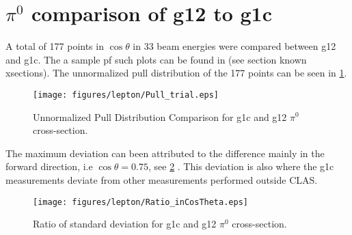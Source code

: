 \section{$\pi^0$ comparison of g12 to g1c}

A total of 177 points in $\cos \theta$ in 33 beam energies were compared between g12 and g1c. The a sample pf such plots can be found in (see section known xsections). The unnormalized pull distribution of the 177 points can be seen in \ref{fig:pi0pull}.
\begin{figure}[htpb]\begin{center}
\texttt{[image: figures/lepton/Pull\_trial.eps]}
\caption[Unnormalized Pull Distribution Comparison for g1c and g12 $\pi^0$ cross-section]{\label{fig:pi0pull}Unnormalized Pull Distribution Comparison for g1c and g12 $\pi^0$ cross-section.}
\end{center}\end{figure}

The maximum deviation can been attributed to the difference mainly in the forward direction, i.e $\cos \theta = 0.75$, see \ref{fig:pi0pulldev} . This deviation is also where the g1c measurements deviate from other measurements performed outside CLAS.
\begin{figure}[htpb]\begin{center}
\texttt{[image: figures/lepton/Ratio\_inCosTheta.eps]}
\caption[Ratio of Standard Deviation for g1c and g12 $\pi^0$ cross-section]{\label{fig:pi0pulldev}Ratio of standard deviation for g1c and g12 $\pi^0$ cross-section.}
\end{center}\end{figure}

